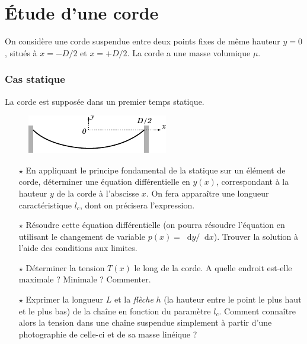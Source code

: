 \documentclass{report}
\newcommand*\dif{\mathop{}\!\mathrm{d}}
\begin{document}
\section*{Étude d'une corde}

On considère une corde suspendue entre deux points fixes de même hauteur $y=0$, situés à $x=-D/2$ et $x=+D/2$. La corde a une masse volumique $\mu$.

\subsubsection{Cas statique}

La corde est supposée dans un premier temps statique.

\begin{figure}[h!]
\centering
		\includegraphics[scale=1.5]{onde1.pdf}
\end{figure}

\begin{itemize}

	\item[$\star$] En appliquant le principe fondamental de la statique sur un élément de corde, déterminer une équation différentielle en $y(x)$, correspondant à la hauteur $y$ de la corde à l'abscisse $x$. On fera apparaître une longueur caractéristique $l_c$, dont on précisera l'expression.
	
	\item[$\star$] Résoudre cette équation différentielle (on pourra résoudre l'équation en utilisant le changement de variable $p(x)=\dif y/\dif x$). Trouver la solution à l'aide des conditions aux limites. 
	
	\item[$\star$] Déterminer la tension $T(x)$ le long de la corde. A quelle endroit est-elle maximale ? Minimale ? Commenter. 
	
	\item[$\star$] Exprimer la longueur $L$ et la \textit{flèche} $h$ (la hauteur entre le point le plus haut et le plus bas) de la chaîne en fonction du paramètre $l_c$. Comment connaître alors la tension dans une chaîne suspendue simplement à partir d'une photographie de celle-ci et de sa masse linéique ?
	
\end{itemize}
\end{document}
